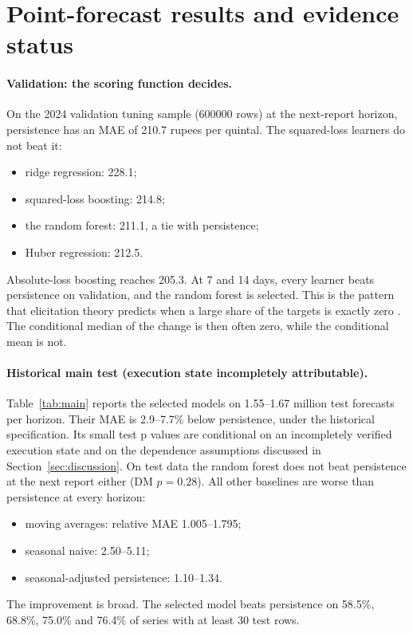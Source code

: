 \section{Point-forecast results and evidence status}\label{sec:point}



\paragraph{Validation: the scoring function decides.}
On the 2024 validation tuning sample (\num{600000} rows) at the next-report horizon, persistence has an MAE of 210.7 rupees per quintal. The squared-loss learners do not beat it:
\begin{itemize}
  \item ridge regression: 228.1;
  \item squared-loss boosting: 214.8;
  \item the random forest: 211.1, a tie with persistence;
  \item Huber regression: 212.5.
\end{itemize}
Absolute-loss boosting reaches 205.3.
At 7 and 14 days, every learner beats persistence on validation, and the random forest is selected.
This is the pattern that elicitation theory predicts when a large share of the targets is exactly zero \cite{gneiting2011making}. The conditional median of the change is then often zero, while the conditional mean is not.

\paragraph{Historical main test (execution state incompletely attributable).}
Table~\ref{tab:main} reports the selected models on 1.55--1.67 million test forecasts per horizon.
Their MAE is 2.9--7.7\% below persistence, under the historical specification. Its small test p values are conditional on an incompletely verified execution state and on the dependence assumptions discussed in Section~\ref{sec:discussion}.
On test data the random forest does not beat persistence at the next report either (DM $p=0.28$).
All other baselines are worse than persistence at every horizon:
\begin{itemize}
  \item moving averages: relative MAE 1.005--1.795;
  \item seasonal naive: 2.50--5.11;
  \item seasonal-adjusted persistence: 1.10--1.34.
\end{itemize}
The improvement is broad. The selected model beats persistence on 58.5\%, 68.8\%, 75.0\% and 76.4\% of series with at least 30 test rows.

